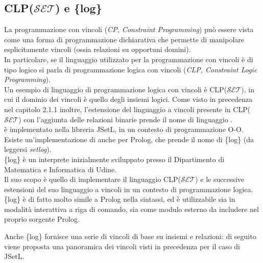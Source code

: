 \subsection{CLP(\(\mathcal{SET}\)) e \{log\}}
La programmazione con vincoli (\emph{CP, Constraint Programming}) può essere vista come una forma di programmazione dichiarativa che permette di manipolare esplicitamente vincoli (ossia relazioni su opportuni domini).\\
In particolare, se il linguaggio utilizzato per la programmazione con vincoli è di tipo logico si parla di programmazione logica con vincoli (\emph{CLP, Constraint Logic Programming}).\\
Un esempio di linguaggio di programmazione logica con vincoli è CLP(\(\mathcal{SET}\)), in cui il dominio dei vincoli è quello degli insiemi logici.
Come visto in precedenza nel capitolo 2.1.1 inoltre, l'estensione del linguaggio a vincoli presente in CLP(\(\mathcal{SET}\)) con l'aggiunta delle relazioni binarie prende il nome di linguaggio .\\

 è implementato nella libreria JSetL, in un contesto di programmazione O-O.\\
Esiste un'implementazione di  anche per Prolog, che prende il nome di \{log\} (da leggersi \emph{setlog}).\\

\{log\} è un interprete inizialmente sviluppato presso il Dipartimento di Matematica e Informatica di Udine.\\
Il suo scopo è quello di implementare il linguaggio CLP(\(\mathcal{SET}\)) e le successive estensioni del suo linguaggio a vincoli in un contesto di programmazione logica.\\
\{log\} è di fatto molto simile a Prolog nella sintassi, ed è utilizzabile sia in modalità interattiva a riga di comando, sia come modulo esterno da includere nel proprio sorgente Prolog.\\

\clearpage

Anche \{log\} fornisce una serie di vincoli di base su insiemi e relazioni: di seguito viene proposta una panoramica dei vincoli visti in precedenza per il caso di JSetL.\\\\

